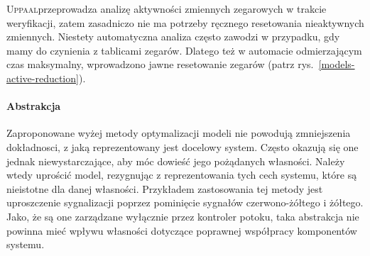 \documentclass{pracamgr}
\newcommand{\imgr}[1]{rys.~\ref{#1}}
\newcommand{\upp}{\textsc{Uppaal}}
\theoremstyle{plain}
\begin{document}
\upp przeprowadza analizę aktywności zmiennych zegarowych w trakcie
weryfikacji, zatem zasadniczo nie ma potrzeby ręcznego resetowania
nieaktywnych zmiennych. Niestety automatyczna analiza często zawodzi w
przypadku, gdy mamy do czynienia z tablicami zegarów. Dlatego też w
automacie odmierzającym czas maksymalny, wprowadzono jawne resetowanie
zegarów (patrz \imgr{models-active-reduction}).

\paragraph{Abstrakcja} Zaproponowane wyżej metody optymalizacji modeli
nie powodują zmniejszenia dokładnosci, z jaką reprezentowany jest
docelowy system. Często okazują się one jednak niewystarczające, aby
móc dowieść jego pożądanych własności. Należy wtedy uprościć model,
rezygnując z reprezentowania tych cech systemu, które są nieistotne
dla danej własności. Przykładem zastosowania tej metody jest
uproszczenie sygnalizacji poprzez pominięcie sygnałów czerwono-żółtego
i żółtego. Jako, że są one zarządzane wyłącznie przez kontroler
potoku, taka abstrakcja nie powinna mieć wpływu własności dotyczące
poprawnej współpracy komponentów systemu. 

{}

\end{document}
